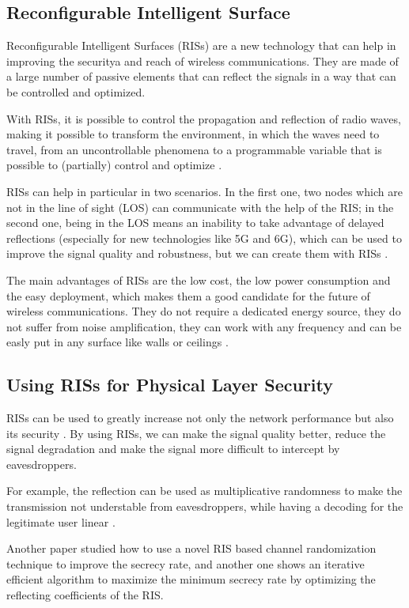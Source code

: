 \subsection{Reconfigurable Intelligent Surface}

Reconfigurable Intelligent Surfaces (RISs) are a new technology that can help in improving the securitya and reach of wireless communications. They are made of a large number of passive elements that can reflect the signals in a way that can be controlled and optimized.

With RISs, it is possible to control the propagation and reflection of radio waves, making it possible to transform the environment, in which the waves need to travel, from an uncontrollable phenomena to a programmable variable that is possible to (partially) control and optimize \cite{9086766}.

RISs can help in particular in two scenarios. In the first one, two nodes which are not in the line of sight (LOS) can communicate with the help of the RIS; in the second one, being in the LOS means an inability to take advantage of delayed reflections (especially for new technologies like 5G and 6G), which can be used to improve the signal quality and robustness, but we can create them with RISs \cite{9086766}.

The main advantages of RISs are the low cost, the low power consumption and the easy deployment, which makes them a good candidate for the future of wireless communications. They do not require a dedicated energy source, they do not suffer from noise amplification, they can work with any frequency and can be easly put in any surface like walls or ceilings \cite{8796365}.

\subsection{Using RISs for Physical Layer Security}

RISs can be used to greatly increase not only the network performance but also its security \cite{10409564}. By using RISs, we can make the signal quality better, reduce the signal degradation and make the signal more difficult to intercept by eavesdroppers.

For example, the reflection can be used as multiplicative randomness to make the transmission not understable from eavesdroppers, while having a decoding for the legitimate user linear \cite{9328149}.

Another paper \cite{s21041439} studied how to use a novel RIS based channel randomization technique to improve the secrecy rate, and another one \cite{8742603} shows an iterative efficient algorithm to maximize the minimum secrecy rate by optimizing the reflecting coefficients of the RIS.

